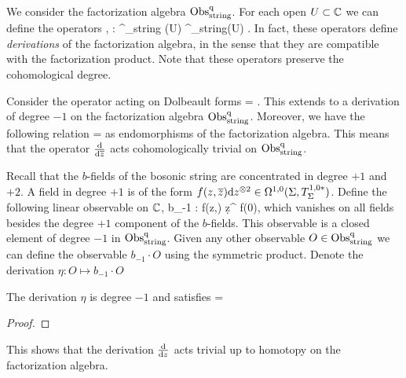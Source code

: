 
\subsubsection{}

We consider the factorization algebra ${\rm Obs}^{\rm q}_{\rm string}$. 
For each open $U \subset \mathbb C$ we can define the operators
\ben
{} , \frac{\d}{\d \zbar} : \Obs^\q_{\rm string} (U) \to \Obs^\q_{\rm string}(U) .
\een 
In fact, these operators define {\em derivations} of the factorization algebra, in the sense that they are compatible with the factorization product. 
Note that these operators preserve the cohomological degree. 

Consider the operator acting on Dolbeault forms
\ben
\Bar{\eta} = \frac{\partial}{\partial (\d \zbar)} .
\een 
This extends to a derivation of degree $-1$ on the factorization algebra ${\rm Obs}^{\rm q}_{\rm string}$. 
Moreover, we have the following relation
 =  \frac{\d}{\d \zbar}
\een 
as endomorphisms of the factorization algebra. 
This means that the operator $\frac{{\rm d}}{{\rm d} \overline{z}}$ acts cohomologically trivial on ${\rm Obs}^{\rm q}_{\rm string}$. 

Recall that the $b$-fields of the bosonic string are concentrated in degree $+1$ and $+2$. 
A field in degree $+1$ is of the form $f(z,\overline{z}) {\rm d} z^{\otimes 2} \in \Omega^{1,0}(\Sigma, T_\Sigma^{1,0*})$. 
Define the following linear observable on $\mathbb C$,
\ben
b_{-1} : f(z,\zbar) \d z^{} \mapsto f(0),
\een 
which vanishes on all fields besides the degree $+1$ component of the $b$-fields.
This observable is a closed element of degree $-1$ in ${\rm Obs}^{\rm q}_{\rm string}$. 
Given any other observable $O \in {\rm Obs}^{{\rm q}}_{\rm string}$ we can define the observable $b_{-1} \cdot O$ using the symmetric product.
Denote the derivation $\eta : O \mapsto b_{-1} \cdot O$

\begin{lem} 
The derivation $\eta$ is degree $-1$ and satisfies 
 = 
\een
\end{lem}
\begin{proof} 
\end{proof}
This shows that the derivation $\frac{{\rm d}}{{\rm d} z}$ acts trivial up to homotopy on the factorization algebra. 
